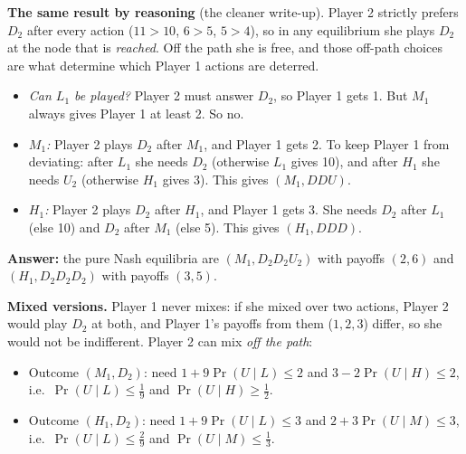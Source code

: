 \documentclass[11pt]{article}
\begin{document}
\textbf{The same result by reasoning} (the cleaner write-up). Player 2 strictly prefers $D_2$ after every action ($11>10$, $6>5$, $5>4$), so in any equilibrium she plays $D_2$ at the node that is \emph{reached}. Off the path she is free, and those off-path choices are what determine which Player 1 actions are deterred.
\begin{itemize}
\item \emph{Can $L_1$ be played?} Player 2 must answer $D_2$, so Player 1 gets 1. But $M_1$ always gives Player 1 at least 2. So no.
\item \emph{$M_1$:} Player 2 plays $D_2$ after $M_1$, and Player 1 gets 2. To keep Player 1 from deviating: after $L_1$ she needs $D_2$ (otherwise $L_1$ gives 10), and after $H_1$ she needs $U_2$ (otherwise $H_1$ gives 3). This gives $(M_1,DDU)$.
\item \emph{$H_1$:} Player 2 plays $D_2$ after $H_1$, and Player 1 gets 3. She needs $D_2$ after $L_1$ (else 10) and $D_2$ after $M_1$ (else 5). This gives $(H_1,DDD)$.
\end{itemize}
\textbf{Answer:} the pure Nash equilibria are $(M_1,D_2D_2U_2)$ with payoffs $(2,6)$ and $(H_1,D_2D_2D_2)$ with payoffs $(3,5)$.

\textbf{Mixed versions.} Player 1 never mixes: if she mixed over two actions, Player 2 would play $D_2$ at both, and Player 1's payoffs from them ($1,2,3$) differ, so she would not be indifferent. Player 2 can mix \emph{off the path}:
\begin{itemize}
\item Outcome $(M_1,D_2)$: need $1+9\Pr(U\mid L)\le 2$ and $3-2\Pr(U\mid H)\le 2$, i.e.\ $\Pr(U\mid L)\le\tfrac19$ and $\Pr(U\mid H)\ge\tfrac12$.
\item Outcome $(H_1,D_2)$: need $1+9\Pr(U\mid L)\le 3$ and $2+3\Pr(U\mid M)\le 3$, i.e.\ $\Pr(U\mid L)\le\tfrac29$ and $\Pr(U\mid M)\le\tfrac13$.
\end{itemize}
\end{document}
